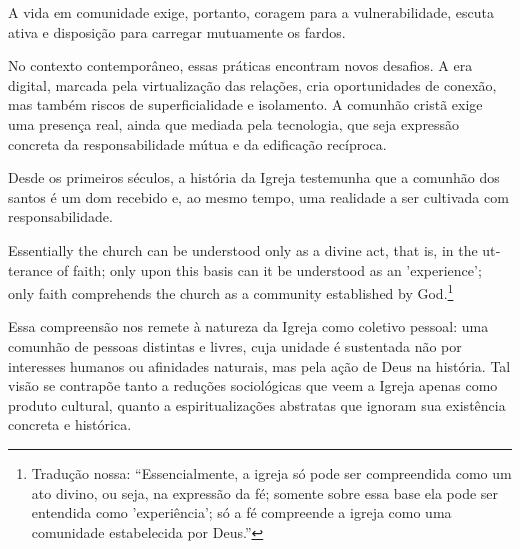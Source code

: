 A vida em comunidade exige, portanto, coragem para a vulnerabilidade, escuta ativa e disposição para carregar mutuamente os fardos.

No contexto contemporâneo, essas práticas encontram novos desafios. A era digital, marcada pela virtualização das relações, cria oportunidades de conexão, mas também riscos de superficialidade e isolamento. A comunhão cristã exige uma presença real, ainda que mediada pela tecnologia, que seja expressão concreta da responsabilidade mútua e da edificação recíproca.

Desde os primeiros séculos, a história da Igreja testemunha que a comunhão dos santos é um dom recebido e, ao mesmo tempo, uma realidade a ser cultivada com responsabilidade.

\begin{citacao}
    \foreignlanguage{english}{Essentially the church can be understood only as a divine act, that is, in the utterance of faith; only upon this basis can it be understood as an 'experience'; only faith comprehends the church as a community established by God.}\footnote{Tradução nossa: ``Essencialmente, a igreja só pode ser compreendida como um ato divino, ou seja, na expressão da fé; somente sobre essa base ela pode ser entendida como 'experiência'; só a fé compreende a igreja como uma comunidade estabelecida por Deus.''} \cite[p.~195]{bonhoeffer1963}
\end{citacao}

Essa compreensão nos remete à natureza da Igreja como coletivo pessoal: uma comunhão de pessoas distintas e livres, cuja unidade é sustentada não por interesses humanos ou afinidades naturais, mas pela ação de Deus na história. Tal visão se contrapõe tanto a reduções sociológicas que veem a Igreja apenas como produto cultural, quanto a espiritualizações abstratas que ignoram sua existência concreta e histórica.
